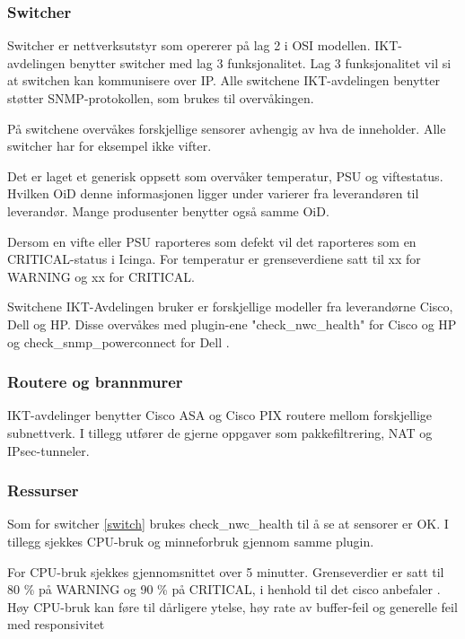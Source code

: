 \subsubsection{Switcher}
Switcher er nettverksutstyr som opererer på lag 2 i OSI modellen. IKT-avdelingen benytter switcher med lag 3 funksjonalitet. Lag 3 funksjonalitet vil si at switchen kan kommunisere over IP. Alle switchene IKT-avdelingen benytter støtter SNMP-protokollen, som brukes til overvåkingen.

På switchene overvåkes forskjellige sensorer avhengig av hva de inneholder. Alle switcher har for eksempel ikke vifter.

Det er laget et generisk oppsett som overvåker temperatur, PSU og viftestatus. Hvilken OiD denne informasjonen ligger under varierer fra leverandøren til leverandør. Mange produsenter benytter også samme OiD. 

Dersom en vifte eller PSU raporteres som defekt vil det raporteres som en CRITICAL-status i Icinga. For temperatur er grenseverdiene satt til xx for WARNING og xx for CRITICAL.

Switchene IKT-Avdelingen bruker er forskjellige modeller fra leverandørne Cisco, Dell og HP. Disse overvåkes med plugin-ene "check\_nwc\_health"  for Cisco og HP og check\_snmp\_powerconnect for Dell .

\subsubsection{Routere og brannmurer}
IKT-avdelinger benytter Cisco ASA og Cisco PIX routere mellom forskjellige subnettverk. I tillegg utfører de gjerne oppgaver som pakkefiltrering, NAT og IPsec-tunneler.
\subsubsection{Ressurser}

Som for switcher \ref{switch} brukes check\_nwc\_health til å se at sensorer er OK. I tillegg
sjekkes CPU-bruk og minneforbruk gjennom samme plugin. 

For CPU-bruk sjekkes gjennomsnittet over 5 minutter. Grenseverdier er satt til 80 \% på WARNING og 90 \% på CRITICAL, i henhold til det cisco anbefaler \cite{ciscounifiedcommunication}. Høy CPU-bruk kan føre til dårligere ytelse, høy rate av buffer-feil og generelle feil med responsivitet \cite{ciscocpurouters}


